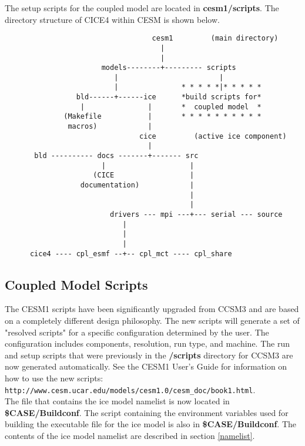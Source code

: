 
The setup scripts for the coupled model are 
located in {\bf cesm1/scripts}. The directory structure of CICE4
within CESM is shown below.

\begin{verbatim}
                                   cesm1         (main directory)
                                     |
                                     |
                       models--------+--------- scripts
                          |                        |
                          |               * * * * *|* * * * * 
                 bld------+------ice      *build scripts for*
                  |               |       *  coupled model  *
              (Makefile           |       * * * * * * * * * *
               macros)            |
                                cice         (active ice component)
                                  |
       bld ---------- docs -------+------- src
                       |                    |
                     (CICE                  |
                  documentation)            |
                                            |
                                            |                  
                         drivers --- mpi ---+--- serial --- source
                            | 
                            |
                            |
      cice4 ---- cpl_esmf --+-- cpl_mct ---- cpl_share

\end{verbatim}

\subsection{Coupled Model Scripts}
\label{coupled_scripts}

The CESM1 scripts have been significantly upgraded from CCSM3 and are
based on a completely different design philosophy.  The new scripts will
generate a set of "resolved scripts" for a specific configuration determined
by the user. The configuration includes components, resolution, run type, and
machine. The run and setup scripts that were previously in the {\bf /scripts}
directory for CCSM3 are now generated automatically.  See the CESM1 User's 
Guide for information on how to use the new scripts:\\

      {\tt http://www.cesm.ucar.edu/models/cesm1.0/cesm\_doc/book1.html}.\\

The file that contains the ice model namelist is now located in 
{\bf \$CASE/Buildconf}. The
script containing the environment variables used for building the executable
file for the ice model is also in {\bf \$CASE/Buildconf}.
The contents of the ice model namelist are described in section \ref{namelist}.
